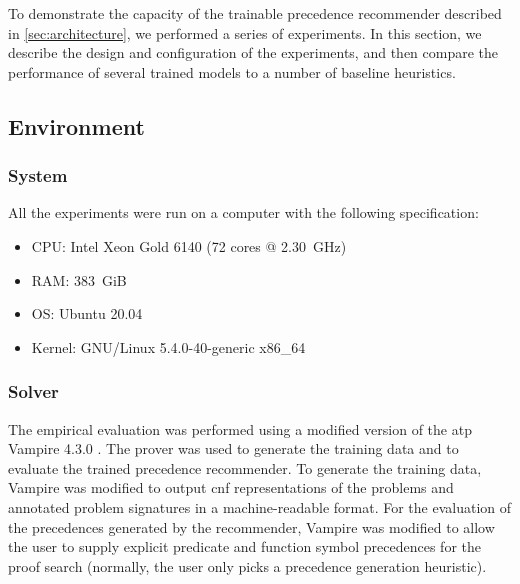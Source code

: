 
To demonstrate the capacity of the trainable precedence recommender described in \cref{sec:architecture},
we performed a series of experiments.
In this section, we describe the design and configuration of the experiments,
and then compare the performance of several trained models to a number of baseline heuristics.

\subsection{Environment}

\subsubsection{System}

All the experiments were run on a computer with the following specification:

\begin{itemize}
\item CPU: Intel Xeon Gold 6140 (72 cores @ \SI{2.30}{GHz})
\item RAM: \SI{383}{GiB}
\item OS: Ubuntu 20.04
\item Kernel: GNU/Linux 5.4.0-40-generic x86\_64
\end{itemize}


\subsubsection{Solver}

The empirical evaluation was performed using a modified version of the \gls{atp} Vampire 4.3.0 \cite{10.1007/978-3-642-39799-8_1}.
The prover was used to generate the training data and to evaluate the trained precedence recommender.
To generate the training data,
Vampire was modified to output \gls{cnf} representations of the problems
and annotated problem signatures in a machine-readable format.
For the evaluation of the precedences generated by the recommender,
Vampire was modified to allow the user to supply explicit predicate and function symbol precedences for the proof search
(normally, the user only picks a precedence generation heuristic).


